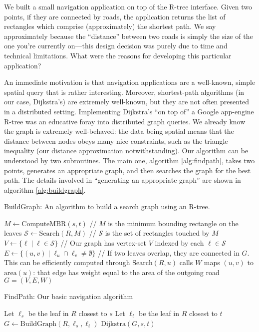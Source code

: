 We built a small navigation application on top of the R-tree interface.
Given two points, if they are connected by roads, the application returns the list of rectangles which comprise (approximately) the shortest path.
We say approximately because the ``distance'' between two roads is simply the size of the one you're currently on---this design decision was purely due to time and technical limitations.
What were the reasons for developing this particular application?

An immediate motivation is that navigation applications are a well-known, simple spatial query that is rather interesting.
Moreover, shortest-path algorithms (in our case, Dijkstra's) are extremely well-known, but they are not often presented in a distributed setting.
Implementing Dijkstra's ``on top of'' a Google app-engine R-tree was an educative foray into distributed graph queries.
We already know the graph is extremely well-behaved: the data being spatial means that the distance between nodes obeys many nice constraints, such as the triangle inequality (our distance approximation notwithstanding).
Our algorithm can be understood by two subroutines.
The main one, algorithm \ref{alg:findpath}, takes two points, generates an appropriate graph, and then searches the graph for the best path.
The details involved in ``generating an appropriate graph'' are shown in algorithm \ref{alg:buildgraph}.

\begin{algorithm}
\caption{BuildGraph: An algorithm to build a search graph using an R-tree.}\label{alg:buildgraph}
$M\longleftarrow\text{ComputeMBR}(s,t)$ // $M$ is the minimum bounding rectangle on the leaves\;
$\mathcal S\longleftarrow\text{Search}(R,M)$ // $\mathcal S$ is the set of rectangles touched by $M$\;
$V\longleftarrow\{\ell\mid\ell\in\mathcal S\}$ // Our graph has vertex-set $V$ indexed by each $\ell\in\mathcal S$\;
$E\longleftarrow\{(u,v)\mid \ell_u\cap\ell_v\neq\emptyset\}$ // If two leaves overlap, they are connected in $G$. This can be efficiently computed through $\text{Search}(R,u)$ calls\;
$W$ maps $(u,v)$ to $\text{area}(u)$: that edge has weight equal to the area of the outgoing road\;
\Return $G=(V,E,W)$\;
\end{algorithm}

\begin{algorithm}
\caption{FindPath: Our basic navigation algorithm}\label{alg:findpath}
Let $\ell_s$ be the leaf in $R$ closest to $s$\;
Let $\ell_t$ be the leaf in $R$ closest to $t$\;
$G\longleftarrow\text{BuildGraph}(R,\ell_s,\ell_t)$\;
\Return $\text{Dijkstra}(G,s,t)$\;
\end{algorithm}

